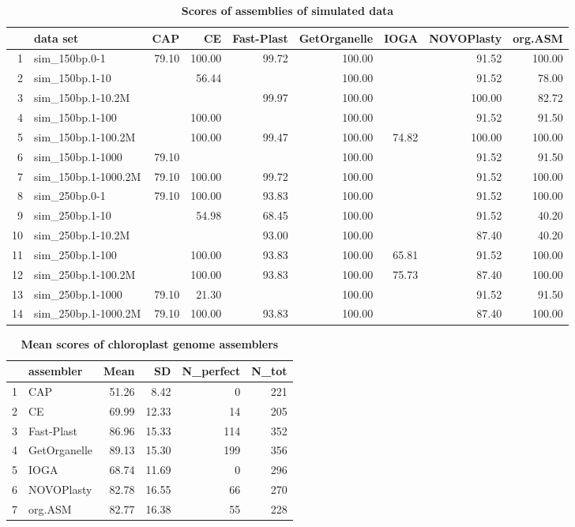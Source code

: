 \documentclass{bmcart}
\begin{document}
\begin{backmatter}
\begin{table}[h!]
\caption{\textbf{Scores of assemblies of simulated data}}
\label{tab:scores_simulated}
\centering
\begin{tabular}{rlrrrrrrr}
  \hline
 & data set & CAP & CE & Fast-Plast & GetOrganelle & IOGA & NOVOPlasty & org.ASM \\ 
  \hline
1 & sim\_150bp.0-1 & 79.10 & 100.00 & 99.72 & 100.00 &  & 91.52 & 100.00 \\ 
  2 & sim\_150bp.1-10 &  & 56.44 &  & 100.00 &  & 91.52 & 78.00 \\ 
  3 & sim\_150bp.1-10.2M &  &  & 99.97 & 100.00 &  & 100.00 & 82.72 \\ 
  4 & sim\_150bp.1-100 &  & 100.00 &  & 100.00 &  & 91.52 & 91.50 \\ 
  5 & sim\_150bp.1-100.2M &  & 100.00 & 99.47 & 100.00 & 74.82 & 100.00 & 100.00 \\ 
  6 & sim\_150bp.1-1000 & 79.10 &  &  & 100.00 &  & 91.52 & 91.50 \\ 
  7 & sim\_150bp.1-1000.2M & 79.10 & 100.00 & 99.72 & 100.00 &  & 91.52 & 100.00 \\ 
  8 & sim\_250bp.0-1 & 79.10 & 100.00 & 93.83 & 100.00 &  & 91.52 & 100.00 \\ 
  9 & sim\_250bp.1-10 &  & 54.98 & 68.45 & 100.00 &  & 91.52 & 40.20 \\ 
  10 & sim\_250bp.1-10.2M &  &  & 93.00 & 100.00 &  & 87.40 & 40.20 \\ 
  11 & sim\_250bp.1-100 &  & 100.00 & 93.83 & 100.00 & 65.81 & 91.52 & 100.00 \\ 
  12 & sim\_250bp.1-100.2M &  & 100.00 & 93.83 & 100.00 & 75.73 & 87.40 & 100.00 \\ 
  13 & sim\_250bp.1-1000 & 79.10 & 21.30 &  & 100.00 &  & 91.52 & 91.50 \\ 
  14 & sim\_250bp.1-1000.2M & 79.10 & 100.00 & 93.83 & 100.00 &  & 87.40 & 100.00 \\ 
   \hline
\end{tabular}
\end{table}

\begin{table}[h!]
\caption{\textbf{Mean scores of chloroplast genome assemblers}}
\label{tab:scores_real}
\centering
\begin{tabular}{rlrrrr}
  \hline
 & assembler & Mean & SD & N\_perfect & N\_tot \\ 
  \hline
  1 & CAP & 51.26 & 8.42 &   0 & 221 \\ 
  2 & CE & 69.99 & 12.33 &  14 & 205 \\ 
  3 & Fast-Plast & 86.96 & 15.33 & 114 & 352 \\ 
  4 & GetOrganelle & 89.13 & 15.30 & 199 & 356 \\ 
  5 & IOGA & 68.74 & 11.69 &   0 & 296 \\ 
  6 & NOVOPlasty & 82.78 & 16.55 &  66 & 270 \\ 
  7 & org.ASM & 82.77 & 16.38 &  55 & 228 \\ 
   \hline
\end{tabular}
\end{table}


\end{backmatter}
\end{document}
